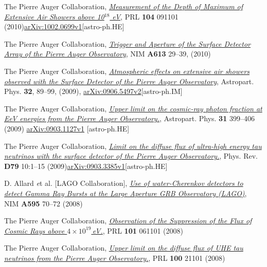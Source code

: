 \begin{etaremune}
\item {}The Pierre Auger Collaboration,
\href{http://dx.doi.org/10.1103/PhysRevLett.104.091101}{\emph{Measurement of
the Depth of Maximum of Extensive Air Showers above 10$^{18}$ eV}}, PRL {\bf
104} 091101
(2010)\href{http://arxiv.org/abs/1002.0699}{arXiv:1002.0699v1}[astro-ph.HE]

\item {}The Pierre Auger Collaboration,
\href{http://dx.doi.org/10.1016/j.nima.2009.11.018}{\emph{Trigger and Aperture
of the Surface Detector Array of the Pierre Auger Observatory}}, NIM {\bf A613}
29--39, (2010)

\item {} The Pierre Auger Collaboration,
\href{http://dx.doi.org/10.1016/j.astropartphys.2009.06.004}{\emph{Atmospheric
effects on extensive air showers observed with the Surface Detector of the
Pierre Auger Observatory}}, Astropart. Phys. {\bf 32}, 89--99, (2009),
\href{http://arxiv.org/abs/0906.5497/}{arXiv:0906.5497v2}[astro-ph.IM]

\item {}The Pierre Auger Collaboration,
\href{http://dx.doi.org/10.1016/j.astropartphys.2009.04.003}{\emph{Upper limit
on the cosmic-ray photon fraction at EeV energies from the Pierre Auger
Observatory.}}, Astropart. Phys. {\bf 31} 399--406 (2009) 
\href{http://arxiv.org/abs/0903.1127/}{arXiv:0903.1127v1} [astro-ph.HE]

\item {}The Pierre Auger Collaboration,
\href{http://dx.doi.org/10.1103/PhysRevD.79.102001}{\emph{Limit on the diffuse
flux of ultra-high energy tau neutrinos with the surface detector of the Pierre
Auger Observatory.}}, Phys. Rev. {\bf D79} 10:1--15
(2009)\href{http://arxiv.org/abs/0903.3385/}{arXiv:0903.3385v1}[astro-ph.HE]

\item {}D. Allard {\emph et al.} [LAGO Collaboration],
\href{http://dx.doi.org/10.1016/j.nima.2008.07.041}{\emph{Use of
water-Cherenkov detectors to detect Gamma Ray Bursts at the Large Aperture GRB
Observatory (LAGO)}}, NIM {\bf A595} 70--72 (2008)

\item {}The Pierre Auger Collaboration,
\href{http://dx.doi.org/10.1103/PhysRevLett.101.061101}{\emph{Observation of
the Suppression of the Flux of Cosmic Rays above $4\times10^{19}$\,eV.}}, PRL
{\bf 101} 061101 (2008)

\item {}The Pierre Auger Collaboration,
\href{http://dx.doi.org/10.1103/PhysRevLett.100.211101}{\emph{Upper limit on
the diffuse flux of UHE tau neutrinos from the Pierre Auger Observatory.}}, PRL
{\bf 100} 21101 (2008)


\end{etaremune}
